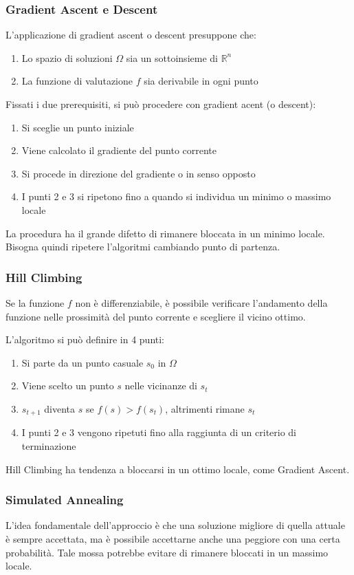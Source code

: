 \documentclass[a4paper]{article}
\begin{document}
\subsubsection{Gradient Ascent e Descent}
L'applicazione di gradient ascent o descent presuppone che:
\begin{enumerate}
    \item Lo spazio di soluzioni $\Omega$ sia un sottoinsieme di $ \mathbb{R}^n$
    \item La funzione di valutazione $f$ sia derivabile in ogni punto
\end{enumerate}
Fissati i due prerequisiti, si può procedere con gradient acent (o descent):
\begin{enumerate}
    \item Si sceglie un punto iniziale
    \item Viene calcolato il gradiente del punto corrente
    \item Si procede in direzione del gradiente o in senso opposto
    \item I punti 2 e 3 si ripetono fino a quando si individua un minimo o massimo locale
\end{enumerate}
La procedura ha il grande difetto di rimanere bloccata in un minimo locale. Bisogna quindi 
ripetere l'algoritmi cambiando punto di partenza.

\subsubsection{Hill Climbing}
Se la funzione $f$ non è differenziabile, è possibile verificare l'andamento della 
funzione nelle prossimità del punto corrente e scegliere il vicino ottimo.

L'algoritmo si può definire in 4 punti:
\begin{enumerate}
    \item Si parte da un punto casuale $s_0$ in $\Omega$
    \item Viene scelto un punto $s$ nelle vicinanze di $s_t$ 
    \item $s_{t+1}$ diventa $s$ se $f(s) > f(s_t)$, altrimenti rimane $s_t$
    \item I punti 2 e 3 vengono ripetuti fino alla raggiunta di un criterio di terminazione
\end{enumerate}
Hill Climbing ha tendenza a bloccarsi in un ottimo locale, come Gradient Ascent.

\subsubsection{Simulated Annealing}
L'idea fondamentale dell'approccio è che una soluzione migliore di quella 
attuale è sempre accettata, ma è possibile accettarne anche una peggiore 
con una certa probabilità.
Tale mossa potrebbe evitare di rimanere bloccati in un massimo locale.
\end{document}
